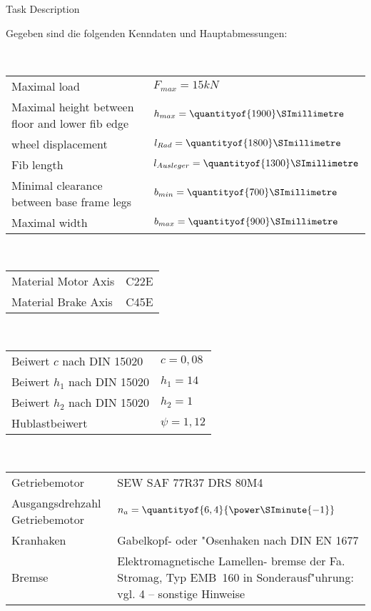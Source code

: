 \documentclass[a4paper]{omdoc}
\begin{document}
\begin{omgroup}{Task Description}
\begin{omtext}
  Gegeben sind die folgenden Kenndaten und Hauptabmessungen:
\end{omtext}

\begin{omtext}[title=Abmessungen / Lasten]\strut\\
\begin{tabular}{ll}
Maximal load	 & $F_{max} = 15 kN$\\
Maximal height between floor and lower fib edge& 	$h_{max} = \quantityof{1900}\SImillimetre$\\
wheel displacement& $l_{Rad} = \quantityof{1800}\SImillimetre$\\
Fib length  & 	$l_{Ausleger} = \quantityof{1300}\SImillimetre$\\
Minimal clearance between base frame legs & 	$b_{min} = \quantityof{700}\SImillimetre$\\
Maximal width & $b_{max} = \quantityof{900}\SImillimetre$
\end{tabular}
\end{omtext}

\begin{omtext}[title=Werkstoffkennwerte]\strut\\
\begin{tabular}{ll}
Material Motor Axis& 	C22E\\
Material Brake Axis& C45E
\end{tabular}
\end{omtext}

\begin{omtext}[title=Beiwerte Seil / Trommel]\strut\\
\begin{tabular}{ll}
Beiwert $c$ nach DIN 15020 & $c = 0,08$ \\
Beiwert $h_1$ nach DIN 15020 & $h_1 = 14$\\
Beiwert $h_2$ nach DIN 15020 & $h_2 = 1$\\
Hublastbeiwert  & $\psi = 1,12$
\end{tabular}
\end{omtext}

\begin{omtext}[title=Angaben zu Zukaufteilen]\strut\\
\begin{tabular}{lp{5cm}}
Getriebemotor & SEW SAF 77R37 DRS 80M4\\
Ausgangsdrehzahl Getriebemotor & $n_a = \quantityof{6,4}{\power\SIminute{-1}}$\\
Kranhaken & Gabelkopf- oder "Osenhaken 	nach DIN EN 1677\\
Bremse	& Elektromagnetische Lamellen-
		bremse der Fa. Stromag, Typ EMB 160 in Sonderausf"uhrung:
                vgl. 4 – sonstige Hinweise
\end{tabular}
\end{omtext}


\end{omgroup}
\end{document}
